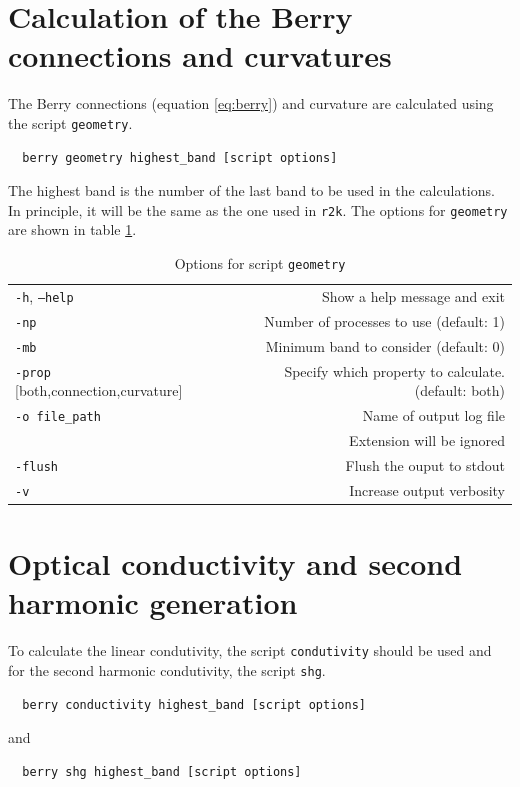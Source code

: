 \documentclass[a4paper,12pt]{report}
\begin{document}
\section{Calculation of the Berry connections and curvatures}

The Berry connections (equation \ref{eq:berry}) and curvature are calculated using the script \texttt{geometry}.
\begin{verbatim}
  berry geometry highest_band [script options]
 \end{verbatim}


The highest band is the number of the last band to be used in the calculations.
In principle, it will be the same as the one used in \texttt{r2k}.
The options for \texttt{geometry} are shown in table \ref{tab:options_geometry}.

\begin{table}[h]
 \centering
 \caption{Options for script \texttt{geometry}}\label{tab:options_geometry}
\begin{tabular}[]{lr}
  \hline
  \texttt{-h}, \texttt{--help}  &\hspace*{2cm} Show a help message and exit \\
  \texttt{-np}                  & Number of processes to use (default: 1) \\
  \texttt{-mb}                  & Minimum band to consider (default: 0) \\
  \texttt{-prop} [both,connection,curvature] &  Specify which property to calculate. (default: both)\\
  \texttt{-o file\_path}        & Name of output log file\\
                                & Extension will be ignored\\
  \texttt{-flush}               & Flush the ouput to stdout \\
  \texttt{-v}                   & Increase output verbosity \\
  \hline
\end{tabular}
\end{table}



\section{Optical conductivity and second harmonic generation}

To calculate the linear condutivity, the script \texttt{condutivity} should be used
and for the second harmonic condutivity, the script \texttt{shg}.
\begin{verbatim}
  berry conductivity highest_band [script options]
 \end{verbatim}
 and
 \begin{verbatim}
  berry shg highest_band [script options]
 \end{verbatim}
\end{document}

